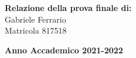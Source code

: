 \documentclass[%
    corpo=11pt,
    oneside,
    oldstyle,
    tipotesi=magistrale,
    greek,
    evenboxes,
]{toptesi}
\begin{document}
\begin{titlepage}
        \vspace{12mm}

        \begin{flushright}
            {\large \textbf{Relazione della prova finale di:}} \\
            \large{Gabriele Ferrario} \\
            \large{Matricola 817518} 
        \end{flushright}
        
        \vspace{16mm}
        \begin{center}
            {\large{\bf Anno Accademico 2021-2022}}
        \end{center}

        \restoregeometry
        
\end{titlepage}



\clearpage

\tableofcontents

\printglossary[type=\acronymtype]


\mainmatter
\doublespacing

\setcounter{page}{1}







\end{document}
